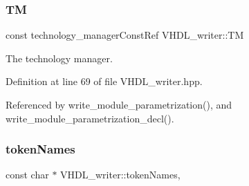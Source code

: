 \subsubsection{\texorpdfstring{TM}{TM}}
{\footnotesize\ttfamily const technology\+\_\+manager\+Const\+Ref V\+H\+D\+L\+\_\+writer\+::\+TM\hspace{0.3cm}{\ttfamily [protected]}}



The technology manager. 



Definition at line 69 of file V\+H\+D\+L\+\_\+writer.\+hpp.



Referenced by write\+\_\+module\+\_\+parametrization(), and write\+\_\+module\+\_\+parametrization\+\_\+decl().

\mbox{\label{structVHDL__writer_a13015c583b732347cdf490034ae02ad3}} 
\subsubsection{\texorpdfstring{token\+Names}{tokenNames}}
{\footnotesize\ttfamily const char $\ast$ V\+H\+D\+L\+\_\+writer\+::token\+Names\hspace{0.3cm}{\ttfamily [static]}, {\ttfamily [protected]}}

